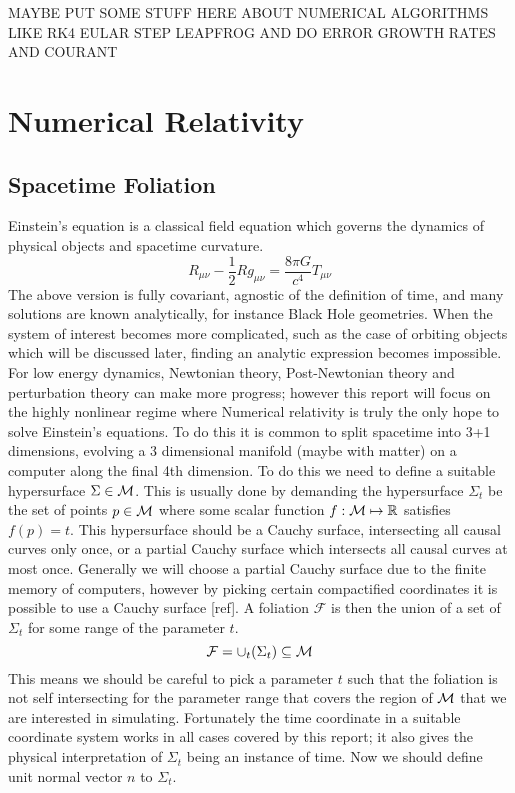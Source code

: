 
MAYBE PUT SOME STUFF HERE ABOUT NUMERICAL ALGORITHMS LIKE RK4 EULAR STEP LEAPFROG AND DO ERROR GROWTH RATES AND COURANT


\section{Numerical Relativity}
\subsection{Spacetime Foliation}
Einstein's equation is a classical field equation which governs the dynamics of physical objects and spacetime curvature. 
\begin{equation}R_{\mu\nu} - \frac{1}{2} Rg_{\mu\nu} = \frac{8\pi G}{c^4}T_{\mu\nu}\end{equation}
The above version is fully covariant, agnostic of the definition of time, and many solutions are known analytically, for instance Black Hole geometries. When the system of interest becomes more complicated, such as the case of orbiting objects which will be discussed later, finding an analytic expression becomes impossible. For low energy dynamics, Newtonian theory, Post-Newtonian theory and perturbation theory can make more progress; however this report will focus on the highly nonlinear regime where Numerical relativity is truly the only hope to solve Einstein's equations. To do this it is common to split spacetime into 3+1 dimensions, evolving a 3 dimensional manifold (maybe with matter) on a computer along the final 4th dimension. To do this we need to define a suitable hypersurface $\Sigma \in \mathcal{M}$. This is usually done by demanding the hypersurface $\Sigma_t$ be the set of points $p \in \mathcal{M}$ where some scalar function $f:\mathcal{M}\mapsto \mathbb{R}$ satisfies $f(p)=t$. This hypersurface should be a Cauchy surface, intersecting all causal curves only once, or a partial Cauchy surface which intersects all causal curves at most once. Generally we will choose a partial Cauchy surface due to the finite memory of computers, however by picking certain compactified coordinates it is possible to use a Cauchy surface [ref]. A foliation $\mathcal{F}$ is then the union of a set of $\Sigma_t$ for some range of the parameter $t$.
\[\mathcal{F} = \cup_t(\Sigma_t) \subseteq \mathcal{M}\]
This means we should be careful to pick a parameter $t$ such that the foliation is not self intersecting for the parameter range that covers the region of $\mathcal{M}$ that we are interested in simulating. Fortunately the time coordinate in a suitable coordinate system works in all cases covered by this report; it also gives the physical interpretation of $\Sigma_t$ being an instance of time. Now we should define unit normal vector $n$ to $\Sigma_t$.
